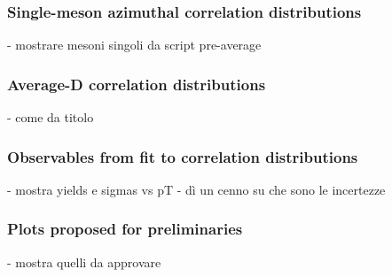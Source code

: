 \subsubsection{Single-meson azimuthal correlation distributions}
- mostrare mesoni singoli da script pre-average

\subsubsection{Average-D correlation distributions}
- come da titolo

\subsubsection{Observables from fit to correlation distributions}
- mostra yields e sigmas vs pT
- dì un cenno su che sono le incertezze

\subsubsection{Plots proposed for preliminaries}
- mostra quelli da approvare